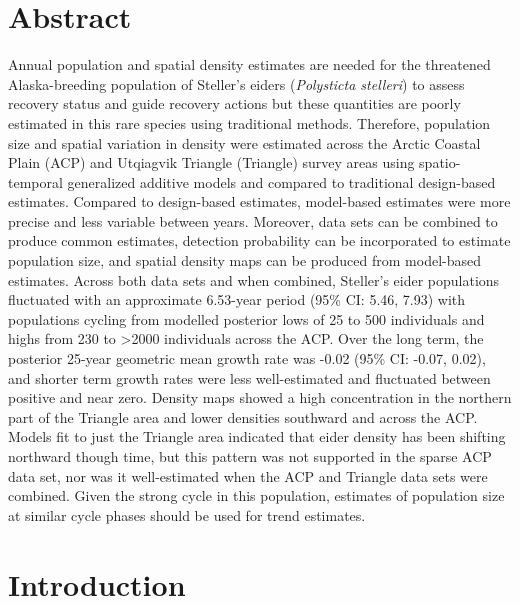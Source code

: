 \documentclass[
  10pt,
  letterpaper,
]{article}
\begin{document}
\section*{Abstract}
Annual population and spatial density estimates are needed for the
threatened Alaska-breeding population of Steller's eiders
(\emph{Polysticta stelleri}) to assess recovery status and guide
recovery actions but these quantities are poorly estimated in this rare
species using traditional methods. Therefore, population size and
spatial variation in density were estimated across the Arctic Coastal
Plain (ACP) and Utqiagvik Triangle (Triangle) survey areas using
spatio-temporal generalized additive models and compared to traditional
design-based estimates. Compared to design-based estimates, model-based
estimates were more precise and less variable between years. Moreover,
data sets can be combined to produce common estimates, detection
probability can be incorporated to estimate population size, and spatial
density maps can be produced from model-based estimates. Across both
data sets and when combined, Steller's eider populations fluctuated with
an approximate 6.53-year period (95\% CI: 5.46, 7.93) with populations
cycling from modelled posterior lows of 25 to 500 individuals and highs
from 230 to \textgreater 2000 individuals across the ACP. Over the long
term, the posterior 25-year geometric mean growth rate was -0.02 (95\% CI:
-0.07, 0.02), and shorter term growth rates were less well-estimated and
fluctuated between positive and near zero. Density maps showed a high
concentration in the northern part of the Triangle area and lower
densities southward and across the ACP. Models fit to just the Triangle
area indicated that eider density has been shifting northward though
time, but this pattern was not supported in the sparse ACP data set, nor
was it well-estimated when the ACP and Triangle data sets were combined.
Given the strong cycle in this population, estimates of population size
at similar cycle phases should be used for trend estimates.

\linenumbers

\section{Introduction}\label{introduction}
\end{document}
